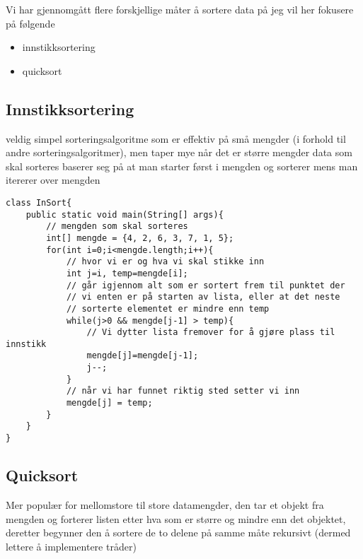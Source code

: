 \documentclass[11pt]{article}
\begin{document}
  Vi har gjennomgått flere forskjellige måter å sortere data på
  jeg vil her fokusere på følgende
\begin{itemize}
\item innstikksortering
\item quicksort
\end{itemize}
\subsection{Innstikksortering}
\label{sec-12_1}

   veldig simpel sorteringsalgoritme som er effektiv på små mengder (i forhold til andre
   sorteringsalgoritmer), men taper mye når det er større mengder data som skal sorteres
   baserer seg på at man starter først i mengden og sorterer mens man itererer over mengden

\begin{verbatim}
class InSort{
    public static void main(String[] args){
        // mengden som skal sorteres 
        int[] mengde = {4, 2, 6, 3, 7, 1, 5}; 
        for(int i=0;i<mengde.length;i++){
            // hvor vi er og hva vi skal stikke inn 
            int j=i, temp=mengde[i]; 
            // går igjennom alt som er sortert frem til punktet der 
            // vi enten er på starten av lista, eller at det neste 
            // sorterte elementet er mindre enn temp
            while(j>0 && mengde[j-1] > temp){ 
                // Vi dytter lista fremover for å gjøre plass til innstikk
                mengde[j]=mengde[j-1]; 
                j--;
            }
            // når vi har funnet riktig sted setter vi inn
            mengde[j] = temp;
        }
    }
}
\end{verbatim}
\subsection{Quicksort}
\label{sec-12_2}


   Mer populær for mellomstore til store datamengder, den tar et objekt fra mengden og
   forterer listen etter hva som er større og mindre enn det objektet, deretter begynner
   den å sortere de to delene på samme måte rekursivt (dermed lettere å implementere
   tråder)
\end{document}
